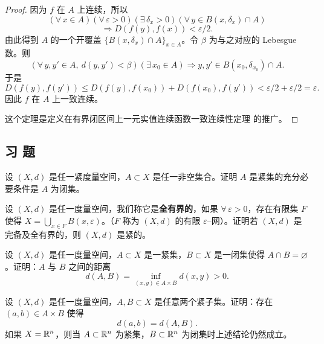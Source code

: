 \begin{proof}

因为 $f$ 在 $A$ 上连续，所以
\[(\forall\,x\in A)(\forall\,\varepsilon>0)(\exists\,\delta_x>0)(\forall\,y\in B(x,\delta_x)\cap A)\]
\[\Longrightarrow D(f(y),f(x))<\varepsilon/2.\]
由此得到 $A$ 的一个开覆盖 $\{B(x,\delta_x)\cap A\}_{x\in A}$。令 $\beta$ 为与之对应的 Lebesgue 数。则
\[(\forall\,y,y'\in A,\ d(y,y')<\beta)(\exists\,x_0\in A)\Longrightarrow y,y'\in B(x_0,\delta_{x_0})\cap A.\]
于是
\[D(f(y),f(y'))\leqslant D(f(y),f(x_0))+D(f(x_0),f(y'))<\varepsilon/2+\varepsilon/2=\varepsilon.\]
因此 $f$ 在 $A$ 上一致连续。

这个定理是定义在有界闭区间上一元实值连续函数一致连续性定理  的推广。

\end{proof}

\subsection*{习 题}

\begin{exercise}
	\item 设 $(X,d)$ 是任一紧度量空间，$A\subset X$ 是任一非空集合。证明 $A$ 是紧集的充分必要条件是 $A$ 为闭集。
\end{exercise}

\begin{exercise}
	\item 设 $(X,d)$ 是任一度量空间，我们称它是\textbf{全有界的}，如果 $\forall\,\varepsilon>0$，存在有限集 $F$ 使得 $X=\displaystyle\bigcup_{x\in F}B(x,\varepsilon)$。（$F$ 称为 $(X,d)$ 的有限 $\varepsilon$--网）。证明若 $(X,d)$ 是完备及全有界的，则 $(X,d)$ 是紧的。
\end{exercise}

\begin{exercise}
	\item 设 $(X,d)$ 是任一度量空间，$A\subset X$ 是一紧集，$B\subset X$ 是一闭集使得 $A\cap B=\varnothing$。证明：$A$ 与 $B$ 之间的距离
	\[d(A,B)=\inf_{(x,y)\in A\times B}d(x,y)>0.\]
\end{exercise}

\begin{exercise}
	\item 设 $(X,d)$ 是任一度量空间，$A,B\subset X$ 是任意两个紧子集。证明：存在 $(a,b)\in A\times B$ 使得
	\[d(a,b)=d(A,B).\]
	如果 $X=\mathbb{R}^n$，则当 $A\subset\mathbb{R}^n$ 为紧集，$B\subset\mathbb{R}^n$ 为闭集时上述结论仍然成立。
\end{exercise}

